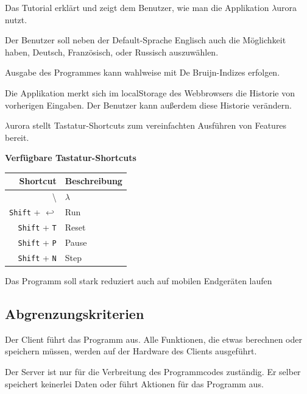 \documentclass[parskip=full,11pt,twoside]{scrartcl}
\begin{document}
Das Tutorial erklärt und zeigt dem Benutzer, wie man die Applikation $\lambda$urora nutzt.

Der Benutzer soll neben der Default-Sprache Englisch auch die Möglichkeit haben, Deutsch, Französisch, oder Russisch auszuwählen.

Ausgabe des Programmes kann wahlweise mit De Bruijn-Indizes erfolgen.

Die Applikation merkt sich im localStorage des Webbrowsers die Historie von vorherigen Eingaben. Der Benutzer kann außerdem diese Historie verändern.

$\lambda$urora stellt Tastatur-Shortcuts zum vereinfachten Ausführen von Features bereit.

\textbf{Verfügbare Tastatur-Shortcuts}

\label{shortcuts}
\begin{tabular}{|r|l|}

    \hline
    Shortcut & Beschreibung \\ \hline
    \textbackslash & $\lambda$ \\ \hline
    \texttt{Shift} + $\hookleftarrow$ & Run \\ \hline
    \texttt{Shift} + \texttt{T} & Reset \\ \hline
    \texttt{Shift} + \texttt{P} & Pause \\ \hline
    \texttt{Shift} + \texttt{N} & Step \\ \hline


\end{tabular}

Das Programm soll stark reduziert auch auf mobilen Endgeräten laufen

\subsection{Abgrenzungskriterien}

Der Client führt das Programm aus. Alle Funktionen, die etwas berechnen oder speichern müssen, werden auf der Hardware des Clients ausgeführt.

Der Server ist nur für die Verbreitung des Programmcodes zuständig. Er selber speichert keinerlei Daten oder führt Aktionen für das Programm aus.
\end{document}
